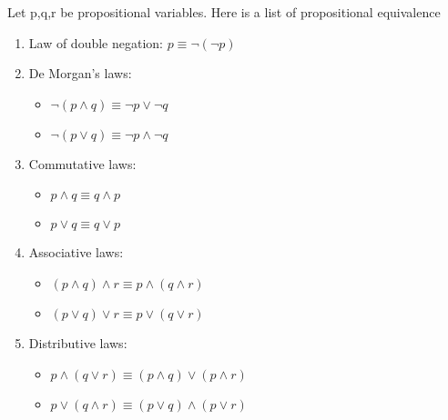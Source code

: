 \documentclass{article}
\begin{document}
\begin{proposition}
    Let p,q,r be propositional variables. Here is a list of propositional
    equivalence
    \begin{enumerate}
	\item Law of double negation: $p \equiv \neg(\neg p)$
	\item De Morgan's laws:
	    \begin{itemize}
		\item $\neg(p \wedge q) \equiv \neg p \vee \neg q $
		\item $\neg(p \vee q) \equiv \neg p \wedge \neg q$
	    \end{itemize}
	\item Commutative laws:
	    \begin{itemize}
		\item $p \wedge q \equiv q \wedge p $
		\item $ p \vee q \equiv q \vee p$
	    \end{itemize}
	\item Associative laws:
	    \begin{itemize}
		\item $(p \wedge q) \wedge r \equiv p \wedge(q \wedge r)$
		\item $(p \vee q) \vee r \equiv p \vee(q \vee r)$
	    \end{itemize}
	\item Distributive laws:
	    \begin{itemize}
		\item $ p \wedge(q \vee r) \equiv(p \wedge q) \vee(p \wedge r) $
		\item $p \vee(q \wedge r) \equiv(p \vee q) \wedge(p \vee r)$
	    \end{itemize}


\end{enumerate}
\end{proposition}
\end{document}
